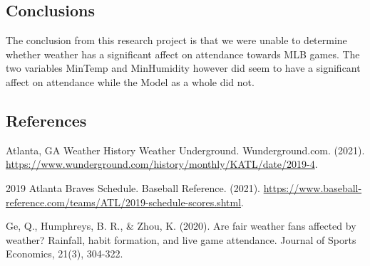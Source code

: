 \documentclass[
]{article}
\begin{document}
\hypertarget{conclusions}{%
\subsection{Conclusions}\label{conclusions}}

The conclusion from this research project is that we were unable to
determine whether weather has a significant affect on attendance towards
MLB games. The two variables MinTemp and MinHumidity however did seem to
have a significant affect on attendance while the Model as a whole did
not.

\hypertarget{references}{%
\subsection{References}\label{references}}

Atlanta, GA Weather History \textbar{} Weather Underground.
Wunderground.com. (2021).
\url{https://www.wunderground.com/history/monthly/KATL/date/2019-4}.

2019 Atlanta Braves Schedule. Baseball Reference. (2021).
\url{https://www.baseball-reference.com/teams/ATL/2019-schedule-scores.shtml}.

Ge, Q., Humphreys, B. R., \& Zhou, K. (2020). Are fair weather fans
affected by weather? Rainfall, habit formation, and live game
attendance. Journal of Sports Economics, 21(3), 304-322.
\end{document}
